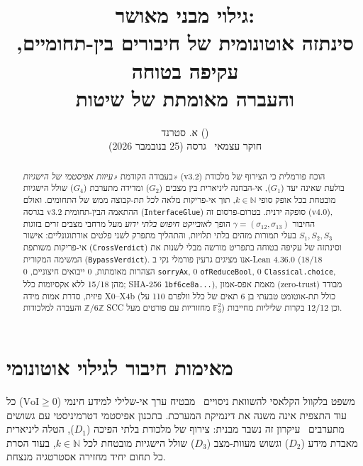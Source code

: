 \documentclass[10pt,a4paper]{article}
\title{\textbf{\Large גילוי מבני מאושר:}\\[4pt]
\large סינתזה אוטונומית של חיבורים בין-תחומיים, עקיפה בטוחה\\
והעברה מאומתת של שיטות}
\author{א. סטרנד (\ltr{A. Strand})\\
\small חוקר עצמאי \textperiodcentered\ גרסה \ltr{v4.0} (25 בנובמבר 2026)}
\date{}
\newcommand{\code}[1]{\foreignlanguage{english}{\nolinkurl{#1}}}
\newcommand{\ltr}[1]{\foreignlanguage{english}{#1}}
\begin{document}
\maketitle

\begin{abstract}
בעבודה הקודמת \emph{«עיוות אפיסטמי של הישגיות»} (\ltr{v3.2}) הוכח פורמלית כי הצירוף של מלכודת בולעת שאינה יעד ($G_1$), אי-הבחנה ליניארית בין מצבים ($G_2$) ומדידה מתערבת ($G_4$) שולל הישגיות מובטחת בכל אופק סופי $k \in \mathbb{N}$, תוך אי-פריקות מלאה לכל תת-קבוצה ממש של התחומים. ואולם בגרסה \ltr{v3.2} ההתאמה הבין-תחומית (\code{InterfaceGlue}) סופקה ידנית. בטרום-פרסום זה (\ltr{v4.0}), החיבור $\gamma = (\sigma_{12}, \sigma_{13})$ הופך ל\emph{אובייקט חיפוש בלתי ידוע} מעל מרחבי מצבים זרים בזוגות $S_1, S_2, S_3$ בעלי תמורות מזהים בלתי תלויות, והתהליך מתפרק לשני פלטים אורתוגונליים: אישור אי-פריקות משותפת (\code{CrossVerdict}) וסינתזה של עקיפה בטוחה בתפריט מורשה מבלי לשנות את המשימה המקורית (\code{BypassVerdict}). אנו מציגים גרעין פורמלי נקי ב-\ltr{Lean 4.36.0} (\ltr{18/18} הצהרות מאומתות, 0 ייבואים חיצוניים, \ltr{0} \code{sorryAx}, \ltr{0} \code{ofReduceBool}, \ltr{0} \code{Classical.choice}, מהן \ltr{15/18} ללא אקסיומות כלל; \ltr{SHA-256} \code{1bf6ce8a...}), מאמת אפס-אמון (\ltr{zero-trust}) מבודד פיזית, סדרת אמות מידה \ltr{X0--X4b} (כולל תת-אוטומט טבעתי בן 6 תאים של כלל וולפרם 110 על $\mathbb{Z}/6\mathbb{Z}$ והעברה למלכודות \ltr{SCC} מחזוריות עם פורטים מעל $\mathbb{F}_3^2$) וכן \ltr{12/12} בקרות שליליות מחייבות.
\end{abstract}

\section{מאימות חיבור לגילוי אוטונומי}

משפט בלקוול הקלאסי להשוואת ניסויים~\cite{blackwell1953,howard1966} מבטיח ערך אי-שלילי למידע חינמי ($\mathrm{VoI} \ge 0$) כל עוד התצפית אינה משנה את דינמיקת המערכת. בתכנון אפיסטמי דטרמיניסטי עם גשושים מתערבים~\cite{fagin1995,vanditmarsch2007,kaelbling1998,strand2026v32} עיקרון זה נשבר מבנית: צירוף של מלכודת בלתי הפיכה ($D_1$), הטלה ליניארית מאבדת מידע ($D_2$) וגשוש מעוות-מצב ($D_3$) שולל הישגיות מובטחת לכל $k \in \mathbb{N}$, בעוד הסרת כל תחום יחיד מחזירה אסטרטגיה מנצחת.
\end{document}
